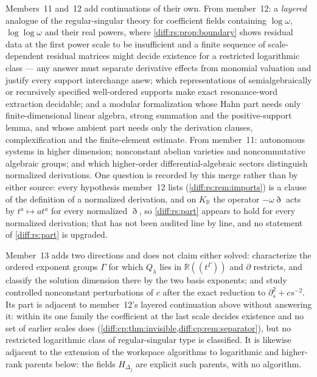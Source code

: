 \documentclass[11pt,letterpaper]{article}
\numberwithin{equation}{section}
\theoremstyle{definition}
\theoremstyle{remark}
\newcommand{\R}{\mathbb R}
\newcommand{\der}{\partial}
\newcommand{\KR}{K_{\R}}
\newcommand{\Dn}{\eth}
\begin{document}
Members~11 and~12 add continuations of their own. From member~12: a
\emph{layered} analogue of the regular-singular theory for coefficient fields
containing $\log\omega$, $\log\log\omega$ and their real powers, where
\cref{diff:rs:prop:boundary} shows residual data at the first power scale to be
insufficient and a finite sequence of scale-dependent residual matrices might
decide existence for a restricted logarithmic class --- any answer must separate
derivative effects from monomial valuation and justify every support interchange
anew; which representations of semialgebraically or recursively specified
well-ordered supports make exact resonance-word extraction decidable; and a
modular formalization whose Hahn part needs only finite-dimensional linear
algebra, strong summation and the positive-support lemma, and whose ambient part
needs only the derivation clauses, complexification and the finite-element
estimate. From member~11: autonomous systems in higher dimension; nonconstant
abelian varieties and noncommutative algebraic groups; and which higher-order
differential-algebraic sectors distinguish normalized derivations. One question
is recorded by this merge rather than by either source: every hypothesis
member~12 lists (\cref{diff:rs:rem:imports}) is a clause of the definition of a
normalized derivation, and on $\KR$ the operator $-\omega\Dn$ acts by
$t^{a}\mapsto at^{a}$ for every normalized $\Dn$, so \cref{diff:rs:part} appears to
hold for every normalized derivation; that has not been audited line by line, and
no statement of \cref{diff:rs:part} is upgraded.

Member~13 adds two directions and does not claim either solved: characterize
the ordered exponent groups $\Gamma$ for which $Q_{\lambda}$ lies in
$\R((t^{\Gamma}))$ and $\der$ restricts, and classify the solution dimension there
by the two basis exponents; and study controlled nonconstant perturbations of
$c$ after the exact reduction to $\der_{s}^{2}+cs^{-2}$. Its part is adjacent to
member~12's layered continuation above without answering it: within its one
family the coefficient at the last scale decides existence and no set of
earlier scales does (\cref{diff:cp:thm:invisible,diff:cp:rem:separator}), but no
restricted logarithmic class of regular-singular type is classified. It is
likewise adjacent to the extension of the workspace algorithms to logarithmic
and higher-rank parents below: the fields $H_{\Delta_{j}}$ are explicit such
parents, with no algorithm.
\end{document}
